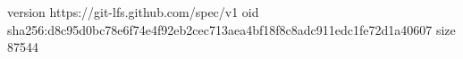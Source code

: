 version https://git-lfs.github.com/spec/v1
oid sha256:d8c95d0bc78e6f74e4f92eb2cec713aea4bf18f8c8adc911edc1fe72d1a40607
size 87544
